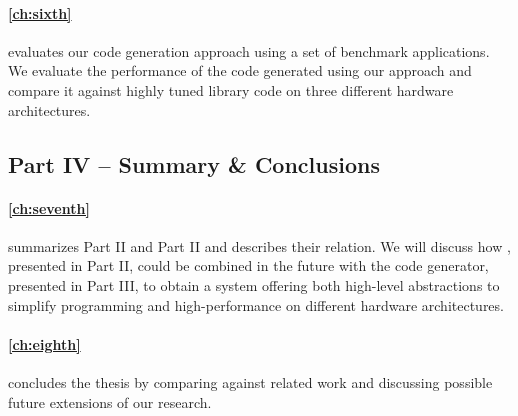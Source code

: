 \paragraph{\autoref{ch:sixth}} evaluates our code generation approach using a set of benchmark applications.
We evaluate the performance of the code generated using our approach and compare it against highly tuned library code on three different hardware architectures.

\subsection*{Part IV -- Summary \& Conclusions}

\paragraph{\autoref{ch:seventh}} summarizes Part II and Part II and describes their relation.
We will discuss how \SkelCL, presented in Part II, could be combined in the future with the code generator, presented in Part III, to obtain a system offering both high-level abstractions to simplify programming and high-performance on different hardware architectures.

\paragraph{\autoref{ch:eighth}} concludes the thesis by comparing against related work and discussing possible future extensions of our research.


